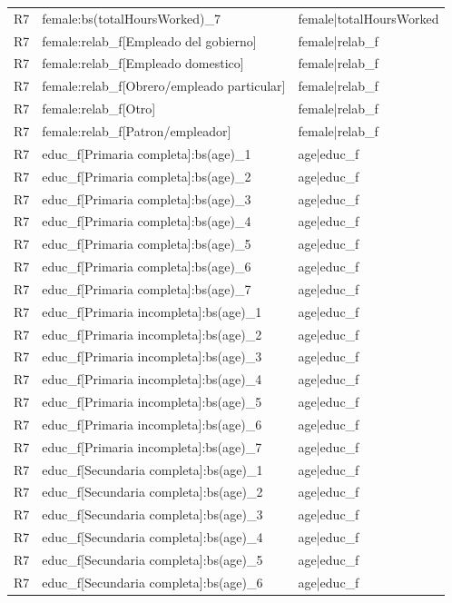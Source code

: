 \begin{longtable}{lll}
R7 & female:bs(totalHoursWorked)\_7 & female|totalHoursWorked \\
R7 & female:relab\_f[Empleado del gobierno] & female|relab\_f \\
R7 & female:relab\_f[Empleado domestico] & female|relab\_f \\
R7 & female:relab\_f[Obrero/empleado particular] & female|relab\_f \\
R7 & female:relab\_f[Otro] & female|relab\_f \\
R7 & female:relab\_f[Patron/empleador] & female|relab\_f \\
R7 & educ\_f[Primaria completa]:bs(age)\_1 & age|educ\_f \\
R7 & educ\_f[Primaria completa]:bs(age)\_2 & age|educ\_f \\
R7 & educ\_f[Primaria completa]:bs(age)\_3 & age|educ\_f \\
R7 & educ\_f[Primaria completa]:bs(age)\_4 & age|educ\_f \\
R7 & educ\_f[Primaria completa]:bs(age)\_5 & age|educ\_f \\
R7 & educ\_f[Primaria completa]:bs(age)\_6 & age|educ\_f \\
R7 & educ\_f[Primaria completa]:bs(age)\_7 & age|educ\_f \\
R7 & educ\_f[Primaria incompleta]:bs(age)\_1 & age|educ\_f \\
R7 & educ\_f[Primaria incompleta]:bs(age)\_2 & age|educ\_f \\
R7 & educ\_f[Primaria incompleta]:bs(age)\_3 & age|educ\_f \\
R7 & educ\_f[Primaria incompleta]:bs(age)\_4 & age|educ\_f \\
R7 & educ\_f[Primaria incompleta]:bs(age)\_5 & age|educ\_f \\
R7 & educ\_f[Primaria incompleta]:bs(age)\_6 & age|educ\_f \\
R7 & educ\_f[Primaria incompleta]:bs(age)\_7 & age|educ\_f \\
R7 & educ\_f[Secundaria completa]:bs(age)\_1 & age|educ\_f \\
R7 & educ\_f[Secundaria completa]:bs(age)\_2 & age|educ\_f \\
R7 & educ\_f[Secundaria completa]:bs(age)\_3 & age|educ\_f \\
R7 & educ\_f[Secundaria completa]:bs(age)\_4 & age|educ\_f \\
R7 & educ\_f[Secundaria completa]:bs(age)\_5 & age|educ\_f \\
R7 & educ\_f[Secundaria completa]:bs(age)\_6 & age|educ\_f \\

\end{longtable}
